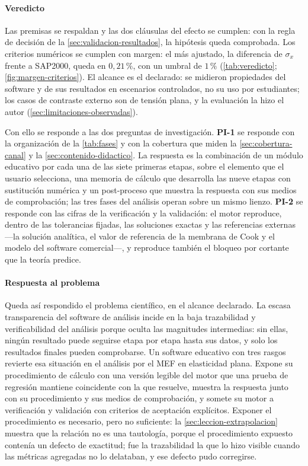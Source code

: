 \paragraph{Veredicto} Las premisas se respaldan y las dos cláusulas del efecto se cumplen: con la regla de decisión de la \autoref{sec:validacion-resultados}, la hipótesis queda comprobada. Los criterios numéricos se cumplen con margen: el más ajustado, la diferencia de $\sigma_x$ frente a SAP2000, queda en $0{,}21\,\%$, con un umbral de $1\,\%$ (\autoref{tab:veredicto}; \autoref{fig:margen-criterios}). El alcance es el declarado: se midieron propiedades del software y de sus resultados en escenarios controlados, no su uso por estudiantes; los casos de contraste externo son de tensión plana, y la evaluación la hizo el autor (\autoref{sec:limitaciones-observadas}).

Con ello se responde a las dos preguntas de investigación. \textbf{PI-1} se responde con la organización de la \autoref{tab:fases} y con la cobertura que miden la \autoref{sec:cobertura-canal} y la \autoref{sec:contenido-didactico}. La respuesta es la combinación de un módulo educativo por cada una de las siete primeras etapas, sobre el elemento que el usuario selecciona, una memoria de cálculo que desarrolla las nueve etapas con sustitución numérica y un post-proceso que muestra la respuesta con sus medios de comprobación; las tres fases del análisis operan sobre un mismo lienzo. \textbf{PI-2} se responde con las cifras de la verificación y la validación: el motor reproduce, dentro de las tolerancias fijadas, las soluciones exactas y las referencias externas ---la solución analítica, el valor de referencia de la membrana de Cook y el modelo del software comercial---, y reproduce también el bloqueo por cortante que la teoría predice.

\paragraph{Respuesta al problema} Queda así respondido el problema científico, en el alcance declarado. La escasa transparencia del software de análisis incide en la baja trazabilidad y verificabilidad del análisis porque oculta las magnitudes intermedias: sin ellas, ningún resultado puede seguirse etapa por etapa hasta sus datos, y solo los resultados finales pueden comprobarse. Un software educativo con tres rasgos revierte esa situación en el análisis por el MEF en elasticidad plana. Expone su procedimiento de cálculo con una versión legible del motor que una prueba de regresión mantiene coincidente con la que resuelve, muestra la respuesta junto con su procedimiento y sus medios de comprobación, y somete su motor a verificación y validación con criterios de aceptación explícitos. Exponer el procedimiento es necesario, pero no suficiente: la \autoref{sec:leccion-extrapolacion} muestra que la relación no es una tautología, porque el procedimiento expuesto contenía un defecto de exactitud; fue la trazabilidad la que lo hizo visible cuando las métricas agregadas no lo delataban, y ese defecto pudo corregirse.

\endgroup

